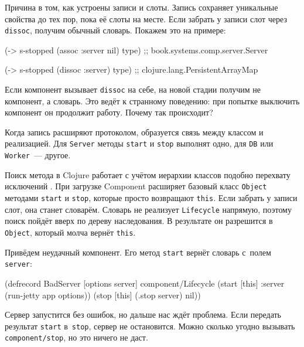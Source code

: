 \fi

Причина в том, как устроены записи и слоты. Запись сохраняет уникальные свойства
до тех пор, пока её слоты на месте. Если забрать у записи слот через
\verb|dissoc|, получим обычный словарь. Покажем это на примере:

\begin{english}
  \begin{clojure}
(-> s-stopped
    (assoc :server nil)
    type)
;; book.systems.comp.server.Server

(-> s-stopped
    (dissoc :server)
    type)
;; clojure.lang.PersistentArrayMap
  \end{clojure}
\end{english}

Если компонент вызывает \verb|dissoc| на себе, на новой стадии получим не
компонент, а словарь. Это ведёт к странному поведению: при попытке выключить
компонент он продолжит работу. Почему так происходит?

Когда запись расширяют протоколом, образуется связь между классом и
реализацией. Для \verb|Server| методы \verb|start| и \verb|stop| выполнят
одно, для \verb|DB| или \verb|Worker|~--- другое.

Поиск метода в Clojure работает с учётом иерархии классов подобно перехвату
исключений . При загрузке Component расширяет базовый класс
\verb|Object| методами \verb|start| и \verb|stop|, которые просто
возвращают \verb|this|. Если забрать у записи слот, она станет
словарём. Словарь не реализует \verb|Lifecycle| напрямую, поэтому поиск пойдёт
вверх по дереву наследования. В результате он разрешится в \verb|Object|,
который молча вернёт \verb|this|.

Привёдем неудачный компонент. Его метод \verb|start| вернёт словарь с~полем
\verb|server|:

\begin{english}
  \begin{clojure}
(defrecord BadServer [options server]
  component/Lifecycle
  (start [this]
    {:server (run-jetty app options)})
  (stop [this]
    (.stop server)
    nil))
  \end{clojure}
\end{english}

Сервер запустится без ошибок, но дальше нас ждёт проблема. Если передать
результат \verb|start| в~\verb|stop|, сервер не остановится. Можно сколько
угодно вызывать \verb|component/stop|, но это ничего не даст.

\ifx\DEVICETYPE\MOBILE

